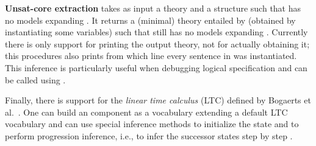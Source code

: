 \textbf{Unsat-core extraction} takes as input a theory \theory and a structure \I such that \theory has no models expanding \I. It returns a (minimal) theory  entailed by \theory (obtained by instantiating some variables) such that  still has no models expanding \I. Currently there is only support for printing the output theory, not for actually obtaining it; this procedures also prints from which line every sentence in  was instantiated. This inference is particularly useful when debugging logical specification and can be called using .

Finally, there is support for the \emph{linear time calculus} (LTC) defined by Bogaerts et al.~\cite{iclp/Bogaerts14}. One
can build an  component as a vocabulary extending a
default LTC vocabulary and can use special inference methods to
initialize the state and to perform progression inference, i.e., to
infer the successor states step by step \cite{iclp/Bogaerts14}.












































































